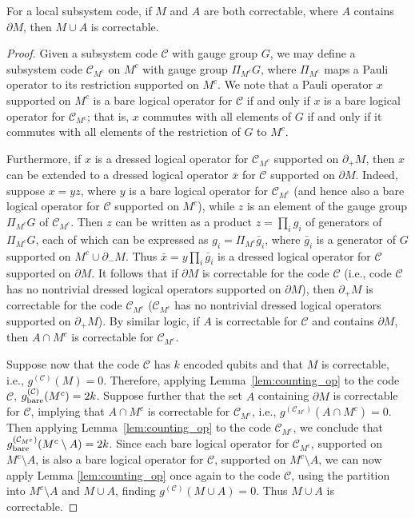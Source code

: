 \begin{lem}
For a local subsystem code, if $M$ and $A$ are both correctable,
where $A$ contains $\partial M$, then $M\cup A$ is correctable.
\label{lem:subsystem-extend}
\end{lem}
\begin{proof}
Given a subsystem code $\mathcal{C}$ with gauge group $G$,
we may define a subsystem code $\mathcal{C}_{M^c}$ on $M^c$ with gauge group $\Pi_{M^c}G$, 
where $\Pi_{M^c}$ maps a Pauli operator to its restriction supported on $M^c$. 
We note that a Pauli operator $x$ supported on $M^c$ is a bare logical operator for $\mathcal{C}$ 
if and only if $x$ is a bare logical operator for $\mathcal{C}_{M^c}$; 
that is, $x$ commutes with all elements of $G$ 
if and only if it commutes with all elements of the restriction of $G$ to $M^c$. 

Furthermore, if $x$ is a dressed logical operator for $\mathcal{C}_{M^c}$ supported on $\partial_+M$, 
then $x$ can be extended to a dressed logical operator $\bar x$ for $\mathcal{C}$ supported on $\partial M$. 
Indeed, suppose $x=yz$, where $y$ is a bare logical operator for $\mathcal{C}_{M^c}$ 
(and hence also a bare logical operator for $\mathcal{C}$ supported on $M^c$), 
while $z$ is an element of the gauge group $\Pi_{M^c} G$ of $\mathcal{C}_{M^c}$. 
Then $z$ can be written as a product $z=\prod_i g_i$ of generators of $\Pi_{M^c} G$, 
each of which can be expressed as $g_i = \Pi_{M^c} \bar g_i$, 
where $\bar g_i$ is a generator of $G$ supported on $M^c\cup  \partial_-M$.
Thus $\bar x = y\prod_i\bar g_i$ is a dressed logical operator for $\mathcal{C}$ supported on $\partial M$. 
It follows that if $\partial M$ is correctable for the code $\mathcal{C}$ 
(i.e., code $\mathcal{C}$ has no nontrivial dressed logical operators supported on $\partial M$), 
then $\partial_+ M$ is correctable for the code $\mathcal{C}_{M^c}$ 
($\mathcal{C}_{M^c}$ has no nontrivial dressed logical operators supported on $\partial_+ M$). 
By similar logic, if $A$ is correctable for $\mathcal{C}$ and contains $\partial M$, 
then $A\cap M^c$ is correctable for $\mathcal{C}_{M^c}$.

Suppose now that the code $\mathcal{C}$ has $k$ encoded qubits and that $M$ is correctable, 
i.e., $g^{(\mathcal{C})}(M)=0$. 
Therefore, applying Lemma~\ref{lem:counting_op} to the code $\mathcal{C}$, 
$g_{\rm bare}^{(\mathcal{C})}(M^c)= 2k$. 
Suppose further that the set $A$ containing $\partial M$ is correctable for $\mathcal{C}$, 
implying that $A\cap M^c$ is correctable for $\mathcal{C}_{M^c}$,
i.e., $g^{(\mathcal{C}_{M^c})}(A\cap M^c)=0$. 
Then applying Lemma~\ref{lem:counting_op} to the code $\mathcal{C}_{M^c}$, 
we conclude that $g_{\rm bare}^{(\mathcal{C}_{M^c})}(M^c\setminus A)=2k$.
Since each bare logical operator for $\mathcal{C}_{M^c}$, supported on $M^c\setminus A$, 
is also a bare logical operator for $\mathcal{C}$, supported on $M^c\setminus A$, 
we can now apply Lemma \ref{lem:counting_op} once again to the code $\mathcal{C}$, 
using the partition into $M^c\setminus A$ and $M\cup A$, 
finding $g^{(\mathcal{C})}(M \cup A)=0$.
Thus $M \cup A$ is correctable. 
\end{proof}

